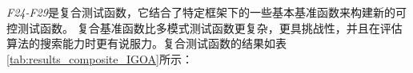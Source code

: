 

\emph{F24-F29}是复合测试函数，它结合了特定框架下的一些基本基准函数来构建新的可控测试函数。 复合基准函数比多模式测试函数更复杂，更具挑战性，并且在评估算法的搜索能力时更有说服力。复合测试函数的结果如表\ref{tab:results_composite_IGOA}所示：


